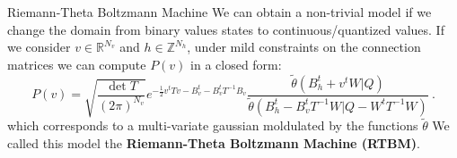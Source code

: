 \documentclass[10pt]{beamer}
\begin{document}
\begin{frame}{Riemann-Theta Boltzmann Machine}
    We can obtain a non-trivial model if we change the domain from binary values states to continuous/quantized values.
    If we consider $v \in \mathbb{R}^{N_v}$ and $h \in \mathbb{Z}^{N_h}$, under mild constraints
    on the connection matrices we can compute $P(v)$ in a closed form:
    \begin{equation*}
        P(v) = \sqrt{\frac{\det T}{(2\pi)^{N_v}}} e^{- \frac{1}{2} v^t T v - B_v^t - B_v^t T^{-1} B_v}
            \frac{\tilde{\theta}(B^t_h+v^t W \vert Q)}
            {\tilde{\theta}(B^t_h-B_v^t T^{-1} W \vert Q - W^t T^{-1} W)} \ .
    \end{equation*}
    which corresponds to a multi-variate gaussian moldulated by the functions $\tilde{\theta}$
    \newline
    We called this model the \textbf{Riemann-Theta Boltzmann Machine (RTBM)}. 


\end{frame}
\end{document}
